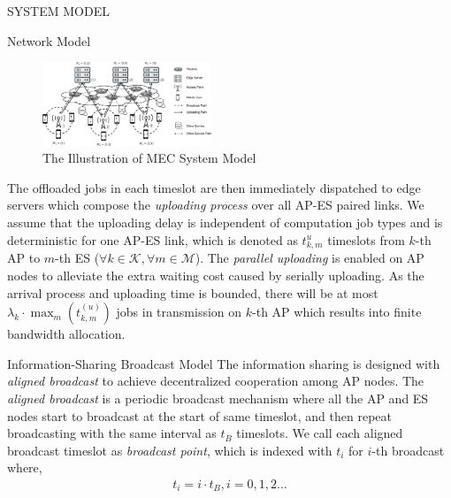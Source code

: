 \documentclass[10pt, conference, letterpaper]{IEEEtran}
\newcommand{\apSet}{\mathcal{K}}
\newcommand{\esSet}{\mathcal{M}}
\begin{document}
\begin{section}{SYSTEM MODEL}
\begin{subsection}{Network Model}
            \begin{figure}[ht]
                \centering
                \includegraphics[width=0.45\textwidth, trim={0.5cm 0.5cm 0.5cm 0.5cm}, clip]{system-model.pdf}
                \caption{The Illustration of MEC System Model}
                \label{fig:system}
            \end{figure}

            The offloaded jobs in each timeslot are then immediately dispatched to edge servers which compose the \emph{uploading process} over all AP-ES paired links. We assume that the uploading delay is independent of computation job types and is deterministic for one AP-ES link, which is denoted as $t^{u}_{k,m}$ timeslots from $k$-th AP to $m$-th ES ($\forall k\in\apSet, \forall m\in\esSet$).
            The \emph{parallel uploading} is enabled on AP nodes to alleviate the extra waiting cost caused by serially uploading. As the arrival process and uploading time is bounded, there will be at most $\lambda_k \cdot \max_m(t^{(u)}_{k,m})$ jobs in transmission on $k$-th AP which results into finite bandwidth allocation.
        \end{subsection}

        \begin{subsection}{Information-Sharing Broadcast Model}
            The information sharing is designed with \emph{aligned broadcast} to achieve decentralized cooperation among AP nodes. The \emph{aligned broadcast} is a periodic broadcast mechanism where all the AP and ES nodes start to broadcast at the start of same timeslot, and then repeat broadcasting with the same interval as $t_B$ timeslots. We call each aligned broadcast timeslot as \emph{broadcast point}, which is indexed with $t_i$ for $i$-th broadcast where,
            \begin{align}
                t_i = i \cdot t_B, i=0,1,2\dots
            \end{align}


\end{subsection}
\end{section}
\end{document}
